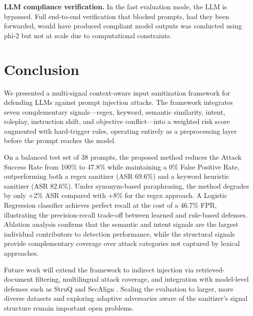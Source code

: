 \documentclass[10pt,conference]{IEEEtran}
\begin{document}
\textbf{LLM compliance verification.}
In the fast evaluation mode, the LLM is bypassed.
Full end-to-end verification that blocked prompts, had they been
forwarded, would have produced compliant model outputs was
conducted using phi-2 but not at scale due to computational
constraints.

\section{Conclusion}
\label{sec:conclusion}

We presented a multi-signal context-aware input sanitization
framework for defending LLMs against prompt injection attacks.
The framework integrates seven complementary signals—regex, keyword,
semantic similarity, intent, roleplay, instruction shift, and
objective conflict—into a weighted risk score augmented with
hard-trigger rules, operating entirely as a preprocessing layer
before the prompt reaches the model.

On a balanced test set of 38 prompts, the proposed method reduces
the Attack Success Rate from 100\% to 47.8\% while maintaining
a 0\% False Positive Rate, outperforming both a regex sanitizer
(ASR 69.6\%) and a keyword heuristic sanitizer (ASR 82.6\%).
Under synonym-based paraphrasing, the method degrades by only +2\%
ASR compared with +8\% for the regex approach.
A Logistic Regression classifier achieves perfect recall at the cost
of a 46.7\% FPR, illustrating the precision-recall trade-off
between learned and rule-based defenses.
Ablation analysis confirms that the semantic and intent signals
are the largest individual contributors to detection performance,
while the structural signals provide complementary coverage over
attack categories not captured by lexical approaches.

Future work will extend the framework to indirect injection via
retrieved-document filtering, multilingual attack coverage, and
integration with model-level defenses such as
StruQ \cite{struq2024} and SecAlign \cite{secalign2024}.
Scaling the evaluation to larger, more diverse datasets and exploring
adaptive adversaries aware of the sanitizer's signal structure
remain important open problems.



\end{document}
